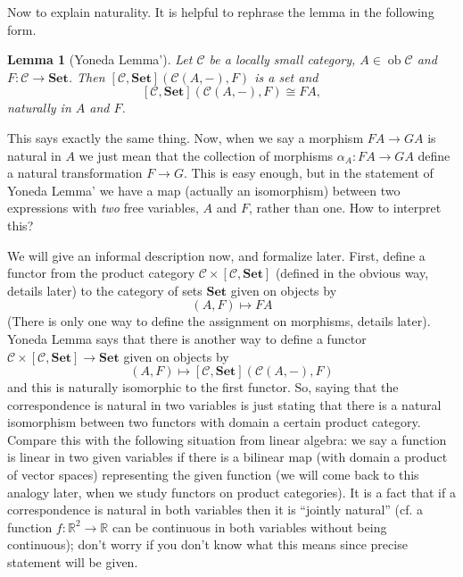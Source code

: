 \documentclass{report}
\newcommand{\mbold}[1]{\mathrm{\mathbf{#1}}}
\DeclareMathOperator{\ob}{ob}
\theoremstyle{definition}
\theoremstyle{plain}
\newtheorem{lem}[thm]{Lemma}
\theoremstyle{definition}
\begin{document}
	 Now to explain naturality. It is helpful to rephrase the lemma in the following form.
	 \begin{lem}[Yoneda Lemma']
	 	Let $\mathcal{C}$ be a locally small category, $A\in\ob \mathcal{C}$ and $F\colon\mathcal{C}\to \mbold{Set}$. Then $[\mathcal{C},\mbold{Set}](\mathcal{C}(A,-), F)$ is a set and
	 	\[
	 		[\mathcal{C},\mbold{Set}](\mathcal{C}(A,-), F) \cong FA,
	 	\]
	 	naturally in $A$ and $F$.
	 \end{lem}
	 This says exactly the same thing. Now, when we say a morphism $FA \to GA$ is natural in $A$ we just mean that the collection of morphisms $\alpha_A \colon FA \to GA$ define a natural transformation $F \to G$. This is easy enough, but in the statement of Yoneda Lemma' we have a map (actually an isomorphism) between two expressions with \emph{two} free variables, $A$ and $F$, rather than one. How to interpret this? 
	 
	 We will give an informal description now, and formalize later. First, define a functor from the product category $\mathcal{C}\times [\mathcal{C}, \mbold{Set}]$ (defined in the obvious way, details later) to the category of sets $\mbold{Set}$ given on objects by
	 \[
	 	(A,F) \mapsto FA
	 \]
	 (There is only one way to define the assignment on morphisms, details later). Yoneda Lemma says that there is another way to define a functor $\mathcal{C}\times [\mathcal{C}, \mbold{Set}]\to \mbold{Set}$ given on objects by
	 \[
	 	(A,F)\mapsto [\mathcal{C},\mbold{Set}](\mathcal{C}(A,-),F)
	 \]
	 and this is naturally isomorphic to the first functor. So, saying that the correspondence is natural in two variables is just stating that there is a natural isomorphism between two functors with domain a certain product category. Compare this with the following situation from linear algebra: we say a function is linear in two given variables if there is a bilinear map (with domain a product of vector spaces) representing the given function (we will come back to this analogy later, when we study functors on product categories). It is a fact that if a correspondence is natural in both variables then it is ``jointly natural'' (cf. a function $f\colon \mathbb{R}^2\to\mathbb{R}$ can be continuous in both variables without being continuous); don't worry if you don't know what this means since precise statement will be given.
\end{document}
